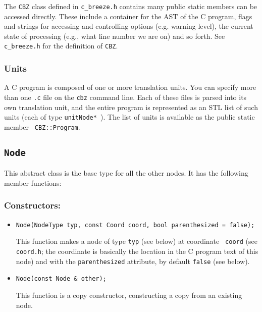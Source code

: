 \documentclass[10pt]{article}
\begin{document}
The {\tt CBZ} class defined in {\tt c\_breeze.h} contains many public static
members can be accessed directly.  These include a container for the AST of
the C program, flags and strings for accessing and controlling options (e.g.
warning level), the current state of processing (e.g., what line number we
are on) and so forth.  See {\tt c\_breeze.h} for the definition of {\tt CBZ}.

\subsubsection{Units}

A C program is composed of one or more translation units.  You can specify
more than one {\tt .c} file on the {\tt cbz} command line.  Each of these
files is parsed into its own translation unit, and the entire program is
represented as an STL list of such units (each of type {\tt unitNode* }).
The list of units is available as the public static member {\tt
CBZ::Program}.


\subsection{{\tt Node}}

This abstract class is the base type for all the other nodes.  It has the
following member functions:

\subsubsection*{Constructors:}

\begin{itemize}
\item
\begin{small}
\begin{verbatim}
Node(NodeType typ, const Coord coord, bool parenthesized = false);
\end{verbatim}
\end{small}

This function makes a node of type {\tt typ} (see below) at coordinate {\tt
coord} (see {\tt coord.h}; the coordinate is basically the location in the C
program text of this node) and with the {\tt parenthesized} attribute, by
default {\tt false} (see below).

\item
\begin{small}
\begin{verbatim}
Node(const Node & other);
\end{verbatim}
\end{small}

This function is a copy constructor, constructing a copy from an existing
node.
\end{itemize}
\end{document}
